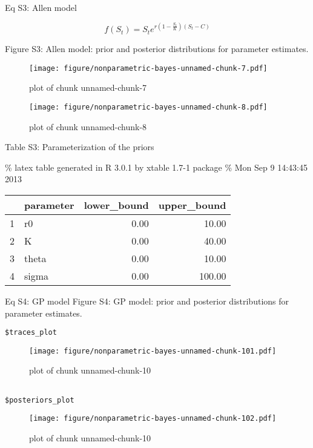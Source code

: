 \documentclass[author-year, review]{elsarticle} %
\makeatletter
\def\maxwidth{\ifdim\Gin@nat@width>\linewidth\linewidth
\else\Gin@nat@width\fi}
\let\Oldincludegraphics\includegraphics
\renewcommand{\includegraphics}[1]{\Oldincludegraphics[width=\maxwidth]{#1}}
\makeatother
\begin{document}
Eq S3: Allen model

\[f(S_t) = S_t e^{r \left(1 - \frac{S_t}{K}\right)\left(S_t - C\right)} \]

Figure S3: Allen model: prior and posterior distributions for parameter
estimates.

\begin{figure}[htbp]
\centering
\texttt{[image: figure/nonparametric-bayes-unnamed-chunk-7.pdf]}
\caption{plot of chunk unnamed-chunk-7}
\end{figure}

\begin{figure}[htbp]
\centering
\texttt{[image: figure/nonparametric-bayes-unnamed-chunk-8.pdf]}
\caption{plot of chunk unnamed-chunk-8}
\end{figure}

Table S3: Parameterization of the priors

\% latex table generated in R 3.0.1 by xtable 1.7-1 package \% Mon Sep 9
14:43:45 2013

\begin{table}[ht]
\centering
\begin{tabular}{rlrr}
  \hline
 & parameter & lower\_bound & upper\_bound \\ 
  \hline
1 & r0 & 0.00 & 10.00 \\ 
  2 & K & 0.00 & 40.00 \\ 
  3 & theta & 0.00 & 10.00 \\ 
  4 & sigma & 0.00 & 100.00 \\ 
   \hline
\end{tabular}
\end{table}

Eq S4: GP model Figure S4: GP model: prior and posterior distributions
for parameter estimates.

\begin{verbatim}
$traces_plot
\end{verbatim}

\begin{figure}[htbp]
\centering
\texttt{[image: figure/nonparametric-bayes-unnamed-chunk-101.pdf]}
\caption{plot of chunk unnamed-chunk-10}
\end{figure}

\begin{verbatim}

$posteriors_plot
\end{verbatim}

\begin{figure}[htbp]
\centering
\texttt{[image: figure/nonparametric-bayes-unnamed-chunk-102.pdf]}
\caption{plot of chunk unnamed-chunk-10}
\end{figure}
\end{document}
